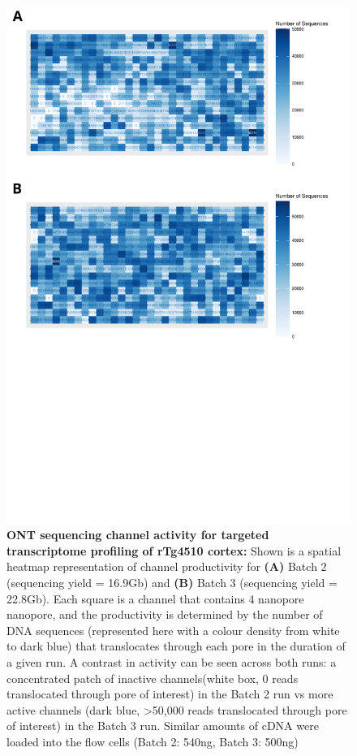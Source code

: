 \begin{figure}[htp]
	\begin{center}
		\includegraphics[page=1,trim={0 13cm 0 0},scale = 0.45]{Figures/ONTTargetedTranscriptome.pdf}
	\end{center}
	\captionsetup{width=0.95\textwidth}
	\caption[ONT sequencing channel activity for targeted transcriptome profiling of rTg4510 cortex]%
	{\textbf{ONT sequencing channel activity for targeted transcriptome profiling of rTg4510 cortex:} Shown is a spatial heatmap representation of channel productivity for \textbf{(A)} Batch 2 (sequencing yield = 16.9Gb) and \textbf{(B)} Batch 3 (sequencing yield = 22.8Gb). Each square is a channel that contains 4 nanopore nanopore, and the productivity is determined by the number of DNA sequences (represented here with a colour density from white to dark blue) that translocates through each pore in the duration of a given run. A contrast in activity can be seen across both runs: a concentrated patch of inactive channels(white box, 0 reads translocated through pore of interest) in the Batch 2 run vs more active channels (dark blue, >50,000 reads translocated through pore of interest) in the Batch 3 run. Similar amounts of cDNA were loaded into the flow cells (Batch 2: 540ng, Batch 3: 500ng)}
	\label{fig:ont_targetedseq_channel}
\end{figure}

